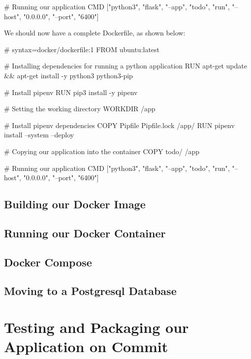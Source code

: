 \documentclass{csse4400}
\begin{document}
\begin{code}[language=docker,numbers=none]{}
  # Running our application
  CMD ["python3", "flask", "--app", "todo", "run", "--host", "0.0.0.0", "--port", "6400"]
\end{code}

We should now have a complete Dockerfile, as shown below:

\begin{code}[language=docker,numbers=none]{}
  # syntax=docker/dockerfile:1
  FROM ubuntu:latest

  # Installing dependencies for running a python application
  RUN apt-get update && apt-get install -y python3 python3-pip

  # Install pipenv
  RUN pip3 install -y pipenv

  # Setting the working directory
  WORKDIR /app

  # Install pipenv dependencies
  COPY Pipfile Pipfile.lock /app/
  RUN pipenv install --system --deploy

  # Copying our application into the container
  COPY todo/ /app
  
  # Running our application
  CMD ["python3", "flask", "--app", "todo", "run", "--host", "0.0.0.0", "--port", "6400"]
\end{code}

\subsection{Building our Docker Image}

\subsection{Running our Docker Container}

\subsection{Docker Compose}

\subsection{Moving to a Postgresql Database}

\section{Testing and Packaging our Application on Commit}

\end{document}
